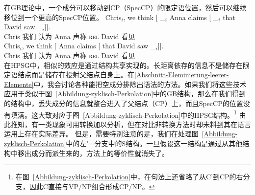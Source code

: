 在GB理论中，一个成分可以移动到CP（SpecCP）的限定语位置，然后可以继续移位到一个更高的SpecCP位置。
\eal\settowidth{}
\ex
\gll Chris$_i$, we think [ \_$_i$ Anna claims [ \_$_i$ that David saw \_$_i$]].\\
    Chris 我们 认为 {} {} Anna 声称 {} {} \textsc{rel} David 看见\\
\ex
\gll Chris$_i$, we think [ Anna claims [ that David saw \_$_i$]].\\
    Chris 我们 认为 {} Anna 声称 {} \textsc{rel} David 看见\\
\zl
在HPSG中，相似的效应是通过结构共享实现的。长距离依存的信息不是储存在限定语结点而是储存在投射父结点自身上。在\ref{Abschnitt-Eleminierung-leerer-Elemente}中，我会讨论各种能把空成分排除出语法的方法。如果我们将这些技术应用于类似于图~\ref{Abbildung-zyklisch-Perkolation}中的GB结构，那么在我们得到的结构中，丢失成分的信息就整合进入了父结点（CP）上，而且SpecCP的位置没有填满。这大致对应于图~\ref{Abbildung-zyklisch-Perkolation}中的HPSG结构。\footnote{%
在图~\ref{Abbildung-zyklisch-Perkolation}中，在句法上还省略了从C’到CP的右分支，因此C直接与VP/NP组合形成CP/NP。%
}
由此推知，有一类现象可用转换加以分析，但在对比非转换方法时却未料到其在语言运用上存在实际差异。
但是，需要特别注意的是，我们在处理图~\ref{Abbildung-zyklisch-Perkolation}中的左"=分支中的S结构。一旦假设这一结构是通过从其他结构中移出成分而派生来的，方法上的等价性就消失了。

